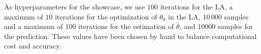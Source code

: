 As hyperparameters for the showcase, we use $100$ iterations for the LA, a maximum of $10$ iterations for the optimization of $\theta_0$ in the LA, $10\,000$ samples and a maximum of $100$ iterations for the estimation of $\hat\theta$, and $10000$ samples for the prediction. These values have been chosen by hand to balance computational cost and accuracy. 

